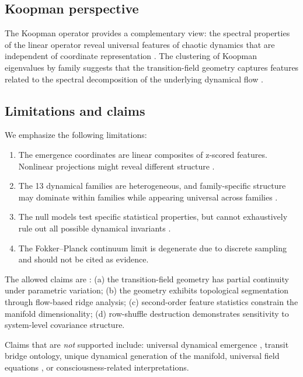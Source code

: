 \documentclass[aip,chaos,showpacs,superscriptaddress,groupedaddress]{revtex4-1}
\begin{document}
\subsection{Koopman perspective}

The Koopman operator \cite{koopman1931hamiltonian, mezic2013analysis} provides a complementary view: the spectral properties of the linear operator reveal universal features of chaotic dynamics that are independent of coordinate representation \cite{brunton2021data, kutz2017dynamic}. The clustering of Koopman eigenvalues by family suggests that the transition-field geometry captures features related to the spectral decomposition of the underlying dynamical flow \cite{farmer1987predicting}.

\subsection{Limitations and claims}

We emphasize the following limitations:
\begin{enumerate}
\item The emergence coordinates are linear composites of z-scored features. Nonlinear projections might reveal different structure \cite{donoho2000intrinsic}.
\item The 13 dynamical families are heterogeneous, and family-specific structure may dominate within families while appearing universal across families \cite{strogatz2015nonlinear}.
\item The null models test specific statistical properties, but cannot exhaustively rule out all possible dynamical invariants \cite{theiler1990estimating}.
\item The Fokker--Planck continuum limit is degenerate due to discrete sampling and should not be cited as evidence.
\end{enumerate}

The allowed claims are \cite{wiggins2003introduction}: (a) the transition-field geometry has partial continuity under parametric variation; (b) the geometry exhibits topological segmentation through flow-based ridge analysis; (c) second-order feature statistics constrain the manifold dimensionality; (d) row-shuffle destruction demonstrates sensitivity to system-level covariance structure.

Claims that are \emph{not} supported include: universal dynamical emergence \cite{tononi2008consciousness}, transit bridge ontology, unique dynamical generation of the manifold, universal field equations \cite{magnasco2009thermodynamic}, or consciousness-related interpretations.
\end{document}
